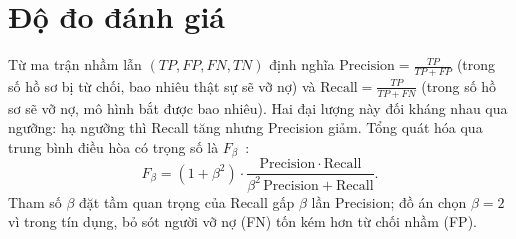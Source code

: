 \documentclass[12pt,a4paper,oneside]{report}
\theoremstyle{vnplain}
\theoremstyle{vndef}
\begin{document}
\section{Độ đo đánh giá}\label{sec:metric}
Từ ma trận nhầm lẫn $(TP,FP,FN,TN)$ định nghĩa
$\mathrm{Precision}=\frac{TP}{TP+FP}$ (trong số hồ sơ bị từ chối, bao nhiêu thật sự sẽ vỡ
nợ) và $\mathrm{Recall}=\frac{TP}{TP+FN}$ (trong số hồ sơ sẽ vỡ nợ, mô hình bắt được bao
nhiêu). Hai đại lượng này đối kháng nhau qua ngưỡng: hạ ngưỡng thì Recall tăng nhưng
Precision giảm. Tổng quát hóa qua trung bình điều hòa có trọng số là
$F_\beta$~\cite{vanrijsbergen1979}:
\begin{equation}
  F_\beta=(1+\beta^2)\cdot\frac{\mathrm{Precision}\cdot\mathrm{Recall}}
  {\beta^2\,\mathrm{Precision}+\mathrm{Recall}}.
  \label{eq:fbeta}
\end{equation}
Tham số $\beta$ đặt tầm quan trọng của Recall gấp $\beta$ lần Precision; đồ án chọn $\beta=2$
vì trong tín dụng, bỏ sót người vỡ nợ (FN) tốn kém hơn từ chối nhầm (FP).
\end{document}

